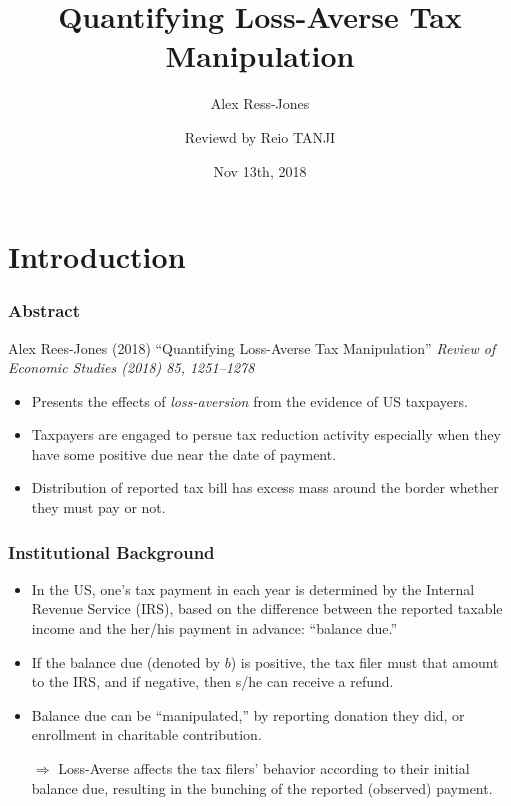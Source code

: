 \documentclass[dvipdfmx,12pt]{beamer}
\title{Quantifying Loss-Averse Tax Manipulation}
\subtitle{Alex Ress-Jones}
\author{Reviewd by Reio TANJI}
\date{Nov 13th, 2018}
\institute{Osaka University}
\begin{document}
\begin{frame}\frametitle{}
\titlepage
\end{frame}

\small

\section{Introduction}
\begin{frame}\frametitle{Abstract}
  Alex Rees-Jones (2018)
  ``Quantifying Loss-Averse Tax Manipulation''
  \textit{Review of Economic Studies (2018) 85, 1251–1278}

  \begin{itemize}
    \item Presents the effects of \textit{loss-aversion} from the evidence of
    US taxpayers.

    \item Taxpayers are engaged to persue tax reduction activity especially
    when they have some positive due near the date of payment.

    \item Distribution of reported tax bill has excess mass around the border
    whether they must pay or not.
  \end{itemize}
\end{frame}

\begin{frame}\frametitle{Institutional Background}
  \begin{itemize}
    \item In the US, one's tax payment in each year is determined by the
    Internal Revenue Service (IRS), based on the difference between the
    reported taxable income and the her/his payment in advance:
    ``balance due.''

    \item If the balance due (denoted by $b$) is positive, the tax filer must
    that amount to the IRS, and if negative, then s/he can receive a refund.

    \item Balance due can be ``manipulated,'' by reporting donation they did,
    or enrollment in charitable contribution.

    $\Rightarrow$ Loss-Averse affects the tax filers' behavior according to
    their initial balance due, resulting in the bunching of the reported
    (observed) payment.

  \end{itemize}
\end{frame}
\end{document}
